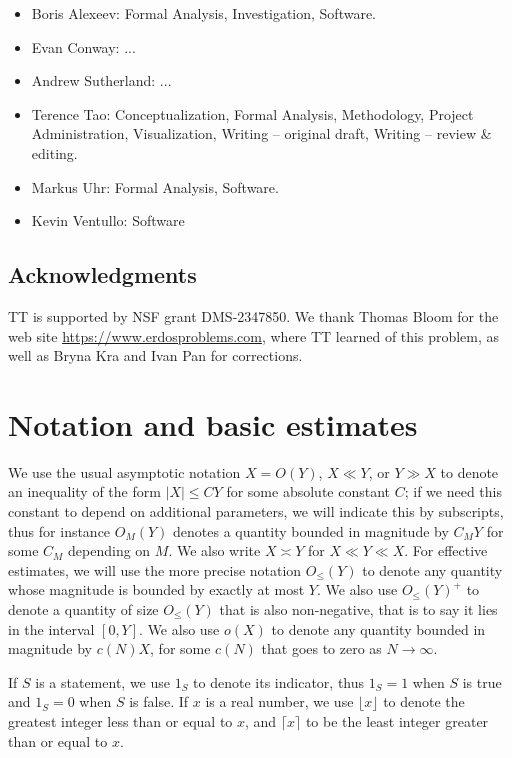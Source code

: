 \documentclass[12pt,a4paper,reqno]{amsart}
\numberwithin{equation}{section}
\theoremstyle{plain}
\theoremstyle{definition}
\begin{document}
\begin{itemize}
\item Boris Alexeev: Formal Analysis, Investigation, Software.
\item Evan Conway: ...
\item Andrew Sutherland: ...
\item Terence Tao: Conceptualization, Formal Analysis, Methodology, Project Administration, Visualization, Writing -- original draft, Writing -- review \& editing.
\item Markus Uhr: Formal Analysis, Software.
\item Kevin Ventullo: Software
\end{itemize}

\subsection{Acknowledgments}

TT is supported by NSF grant DMS-2347850.  We thank Thomas Bloom for the web site \url{https://www.erdosproblems.com}, where TT learned of this problem, as well as Bryna Kra and Ivan Pan for  corrections.


\section{Notation and basic estimates}

We use the usual asymptotic notation $X = O(Y)$, $X \ll Y$, or $Y \gg X$ to denote an inequality of the form $|X| \leq CY$ for some absolute constant $C$; if we need this constant to depend on additional parameters, we will indicate this by subscripts, thus for instance $O_M(Y)$ denotes a quantity bounded in magnitude by $C_M Y$ for some $C_M$ depending on $M$.  We also write $X \asymp Y$ for $X \ll Y \ll X$. For effective estimates, we will use the more precise notation $O_{\leq}(Y)$ to denote any quantity whose magnitude is bounded by exactly at most $Y$. We also use $O_{\leq}(Y)^+$ to denote a quantity of size $O_{\leq}(Y)$ that is also non-negative, that is to say it lies in the interval $[0,Y]$.  We also use $o(X)$ to denote any quantity bounded in magnitude by $c(N) X$, for some $c(N)$ that goes to zero as $N \to \infty$.

If $S$ is a statement, we use $1_S$ to denote its indicator, thus $1_S=1$ when $S$ is true and $1_S=0$ when $S$ is false.  If $x$ is a real number, we use $\lfloor x \rfloor$ to denote the greatest integer less than or equal to $x$, and $\lceil x \rceil$ to be the least integer greater than or equal to $x$.
\end{document}
